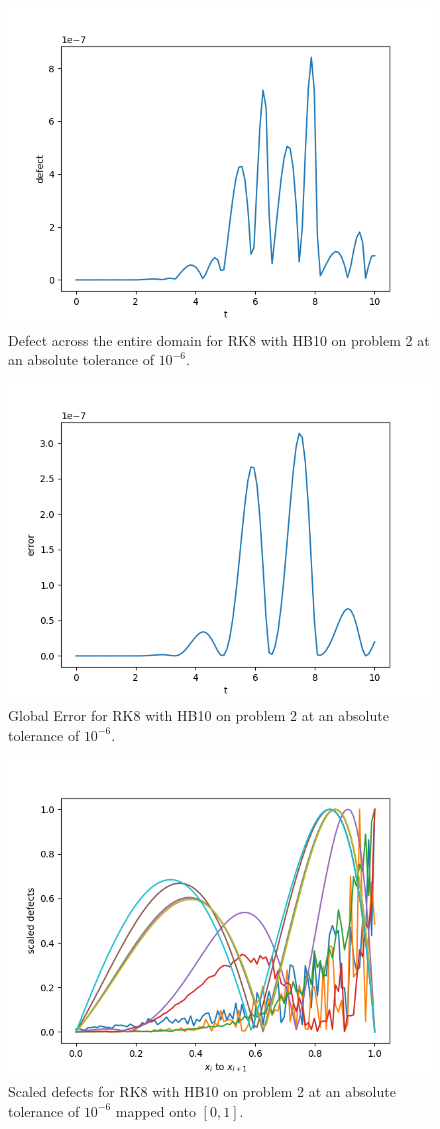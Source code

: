 \begin{figure}[H]
\centering
\includegraphics[width=0.7\linewidth]{./figures/rk8_with_hb10_p2_global_defect}
\caption{Defect across the entire domain for RK8 with HB10 on problem 2 at an absolute tolerance of $10^{-6}$.}
\label{fig:rk8_with_hb10_p2_global_defect}
\end{figure}

\begin{figure}[H]
\centering
\includegraphics[width=0.7\linewidth]{./figures/rk8_with_hb10_p2_global_error}
\caption{Global Error for RK8 with HB10 on problem 2 at an absolute tolerance of $10^{-6}$.}
\label{fig:rk8_with_hb10_p2_global_error}
\end{figure}

\begin{figure}[H]
\centering
\includegraphics[width=0.7\linewidth]{./figures/rk8_with_hb10_p2_scaled_defects}
\caption{Scaled defects for RK8 with HB10 on problem 2 at an absolute tolerance of $10^{-6}$  mapped onto $[0, 1]$.}
\label{fig:rk8_with_hb10_p2_scaled_defects}
\end{figure}

